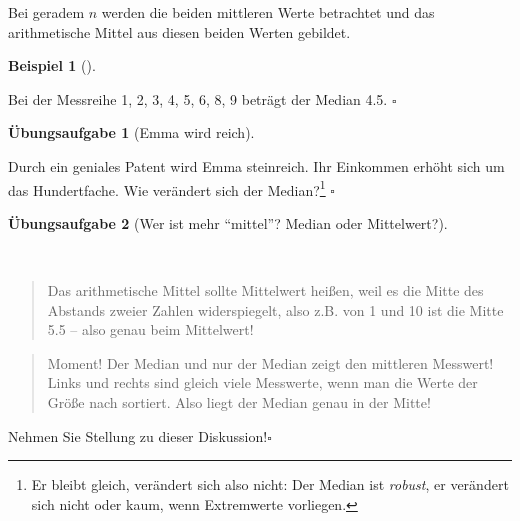 \documentclass[
  letterpaper,
  twoside,
  open=any]{scrbook}
\theoremstyle{definition}
\theoremstyle{definition}
\newtheorem{exercise}{Übungsaufgabe}[chapter]
\theoremstyle{definition}
\newtheorem{example}{Beispiel}[chapter]
\theoremstyle{remark}
\begin{document}
Bei geradem \(n\) werden die beiden mittleren Werte betrachtet und das
arithmetische Mittel aus diesen beiden Werten gebildet.

\begin{example}[]\protect\hypertarget{exm-med2}{}\label{exm-med2}

Bei der Messreihe 1, 2, 3, 4, 5, 6, 8, 9 beträgt der Median 4.5.
\(\square\)

\end{example}

\begin{exercise}[Emma wird
reich]\protect\hypertarget{exr-md2}{}\label{exr-md2}

Durch ein geniales Patent wird Emma steinreich. Ihr Einkommen erhöht
sich um das Hundertfache. Wie verändert sich der Median?\footnote{Er
  bleibt gleich, verändert sich also nicht: Der Median ist
  \emph{robust}, er verändert sich nicht oder kaum, wenn Extremwerte
  vorliegen.} \(\square\)

\end{exercise}

\begin{exercise}[Wer ist mehr \enquote{mittel}? Median oder
Mittelwert?]\protect\hypertarget{exr-mw-md}{}\label{exr-mw-md}

~

\begin{quote}
{} Das arithmetische Mittel sollte Mittelwert heißen,
weil es die Mitte des Abstands zweier Zahlen widerspiegelt, also z.B.
von 1 und 10 ist die Mitte 5.5 -- also genau beim Mittelwert!
\end{quote}

\begin{quote}
{} Moment! Der Median und nur der Median zeigt den
mittleren Messwert! Links und rechts sind gleich viele Messwerte, wenn
man die Werte der Größe nach sortiert. Also liegt der Median genau in
der Mitte!
\end{quote}

Nehmen Sie Stellung zu dieser Diskussion!\(\square\)

\end{exercise}
\end{document}
